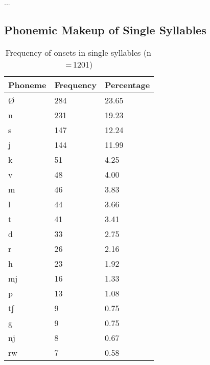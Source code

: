 ...

\subsection{Phonemic Makeup of Single Syllables}

\begin{table}[pth]\centering
\caption[Frequency of onsets in single syllables]{Frequency of onsets in single syllables (n\,=\,1201)}
\begin{tabu} to 0.5\textwidth{X X[c] X[c]}
\tableheaderfont\toprule
Phoneme
	& Frequency
	& Percentage
	\\
	
\toprule

Ø
	& 284
	& 23.65\pct
	\\

\midrule

n
	& 231
	& 19.23\pct
	\\

s
	& 147
	& 12.24\pct
	\\

j
	& 144
	& 11.99\pct
	\\

k
	& 51
	& 4.25\pct
	\\

v
	& 48
	& 4.00\pct
	\\

m
	& 46
	& 3.83\pct
	\\

l
	& 44
	& 3.66\pct
	\\

t
	& 41
	& 3.41\pct
	\\

d
	& 33
	& 2.75\pct
	\\

r
	& 26
	& 2.16\pct
	\\

h
	& 23
	& 1.92\pct
	\\

mj
	& 16
	& 1.33\pct
	\\

p
	& 13
	& 1.08\pct
	\\

tʃ
	& 9
	& 0.75\pct
	\\

g
	& 9
	& 0.75\pct
	\\

nj
	& 8
	& 0.67\pct
	\\

rw
	& 7
	& 0.58\pct
	\\


\end{tabu}
\end{table}
